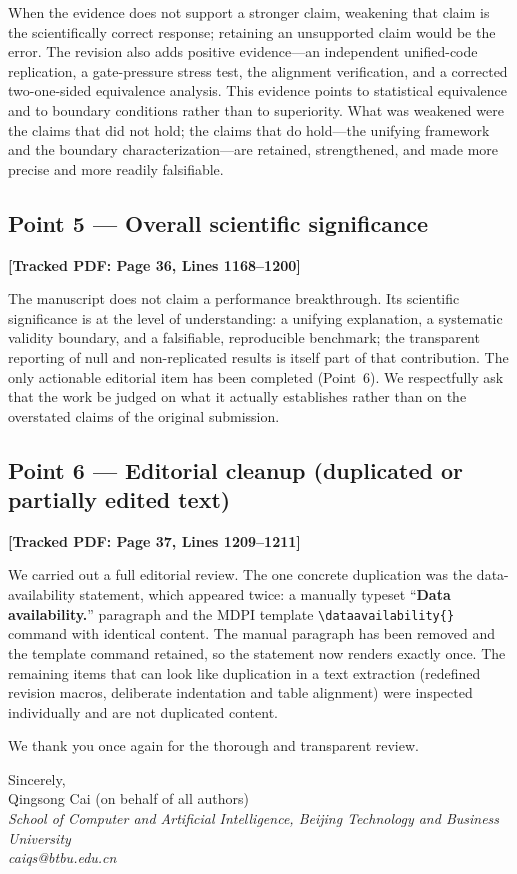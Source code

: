 \documentclass[11pt]{article}
\newcommand{\loc}[1]{\textbf{[\textcolor{revblue}{Tracked PDF: #1}]}}
\begin{document}
When the evidence does not support a stronger claim, weakening that claim is
the scientifically correct response; retaining an unsupported claim would be
the error. The revision also adds positive evidence---an independent
unified-code replication, a gate-pressure stress test, the alignment
verification, and a corrected two-one-sided equivalence analysis. This
evidence points to statistical equivalence and to boundary conditions rather
than to superiority. What was weakened were the claims that did not hold; the
claims that do hold---the unifying framework and the boundary
characterization---are retained, strengthened, and made more precise and more
readily falsifiable.

\subsection*{Point 5 --- Overall scientific significance}
\loc{Page 36, Lines 1168--1200}

The manuscript does not claim a performance breakthrough. Its scientific
significance is at the level of understanding: a unifying explanation, a
systematic validity boundary, and a falsifiable, reproducible benchmark; the
transparent reporting of null and non-replicated results is itself part of that
contribution. The only actionable editorial item has been completed (Point~6).
We respectfully ask that the work be judged on what it actually establishes
rather than on the overstated claims of the original submission.

\subsection*{Point 6 --- Editorial cleanup (duplicated or partially edited text)}
\loc{Page 37, Lines 1209--1211}

We carried out a full editorial review. The one concrete duplication was the
data-availability statement, which appeared twice: a manually typeset
``\textbf{Data availability.}'' paragraph and the MDPI template
\texttt{\textbackslash dataavailability\{\}} command with identical content.
The manual paragraph has been removed and the template command retained, so the
statement now renders exactly once. The remaining items that can look like
duplication in a text extraction (redefined revision macros, deliberate
indentation and table alignment) were inspected individually and are not
duplicated content.

\vspace{0.6em}
We thank you once again for the thorough and transparent review.

\vspace{0.8em}
Sincerely,\\
Qingsong Cai (on behalf of all authors)\\
\textit{School of Computer and Artificial Intelligence, Beijing Technology and
Business University}\\
\textit{caiqs@btbu.edu.cn}
\end{document}
